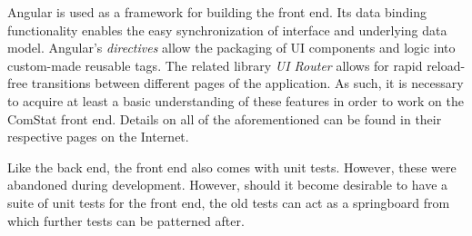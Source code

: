 Angular is used as a framework for building the front end. Its data binding functionality enables the easy synchronization of interface and underlying data model. Angular's \emph{directives} allow the packaging of UI components and logic into custom-made reusable tags. The related library \emph{UI Router} allows for rapid reload-free transitions between different pages of the application. As such, it is necessary to acquire at least a basic understanding of these features in order to work on the ComStat front end. Details on all of the aforementioned can be found in their respective pages on the Internet.

Like the back end, the front end also comes with unit tests. However, these were abandoned during development. However, should it become desirable to have a suite of unit tests for the front end, the old tests can act as a springboard from which further tests can be patterned after.



